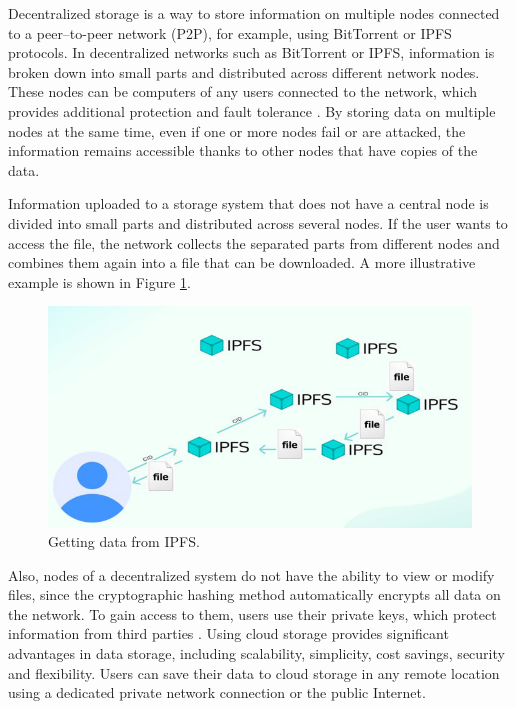 \documentclass[10pt,conference,a4paper]{IEEEtran_EDM}
\begin{document}
Decentralized storage is a way to store information on multiple nodes connected to a peer–to-peer network (P2P), for example, using BitTorrent or IPFS \cite{IPFS} protocols.
In decentralized networks such as BitTorrent or IPFS, information is broken down into small parts and distributed across different network nodes.
These nodes can be computers of any users connected to the network, which provides additional protection and fault tolerance \cite{Anisimov}.
By storing data on multiple nodes at the same time, even if one or more nodes fail or are attacked, the information remains accessible thanks to other nodes that have copies of the data.

Information uploaded to a storage system that does not have a central node is divided into small parts and distributed across several nodes. If the user wants to access the file, the network collects the separated parts from different nodes and combines them again into a file that can be downloaded. A more illustrative example is shown in Figure \ref{data_IPFS}.

\begin{figure}[htbp]
\centerline{\includegraphics[scale=0.71]{fig1.png}}
\caption{Getting data from IPFS.}
\label{data_IPFS}
\end{figure}

Also, nodes of a decentralized system do not have the ability to view or modify files, since the cryptographic hashing method automatically encrypts all data on the network. To gain access to them, users use their private keys, which protect information from third parties \cite{Web3Browsers}.
Using cloud storage provides significant advantages in data storage, including scalability, simplicity, cost savings, security and flexibility. Users can save their data to cloud storage in any remote location using a dedicated private network connection or the public Internet.
\end{document}
